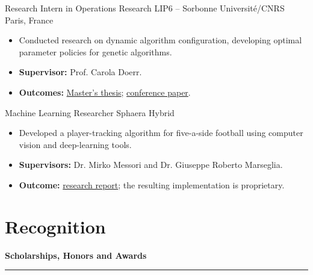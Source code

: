 \documentclass[11pt,a4paper,sans]{moderncv}
\newcommand{\cvsubsection}[1]{%
  \par
  \vspace{0.9em}%
  \noindent
  {\large\bfseries\color{cvaccent}#1}%
  \par
  \vspace{0.15em}%
  \noindent
  {\color{cvline}\rule{\textwidth}{0.4pt}}%
  \par
  \vspace{0.7em}%
}
\begin{document}
%
        {Research Intern in Operations Research}%
        {LIP6 -- Sorbonne Universit\'e/CNRS}%
        {Paris, France}%
        {}%
        {\begin{itemize}
          \item Conducted research on dynamic algorithm configuration, developing optimal parameter policies for genetic algorithms.
          \item \textbf{Supervisor:} Prof. Carola Doerr.
          \item \textbf{Outcomes:} \href{https://unitesi.unipv.it/handle/20.500.14239/28559}{Master's thesis}; \href{https://www.arxiv.org/abs/2507.08368}{conference paper}.
        \end{itemize}}

%
        {Machine Learning Researcher}%
        {Sphaera}%
        {Hybrid}%
        {}%
        {\begin{itemize}
          \item Developed a player-tracking algorithm for five-a-side football using computer vision and deep-learning tools.
          \item \textbf{Supervisors:} Dr. Mirko Messori and Dr. Giuseppe Roberto Marseglia.
          \item \textbf{Outcome:} \href{https://gianlucacovini.github.io/assets/files/Reports/Relazione_Sphaera_compressed.pdf}{research report}; the resulting implementation is proprietary.
        \end{itemize}}

\section{Recognition}
\cvsubsection{Scholarships, Honors and Awards}



\end{document}
